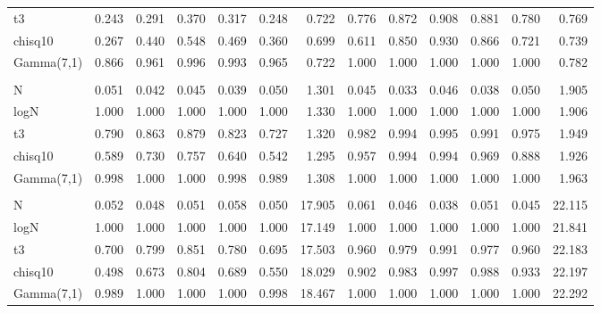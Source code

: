 \begin{table}[!h]
{\begin{tabular}[t]{lrrrrrrrrrrrr}
\hspace{1em}t3 & 0.243 & 0.291 & 0.370 & 0.317 & 0.248 & 0.722 & 0.776 & 0.872 & 0.908 & 0.881 & 0.780 & 0.769\\
\hspace{1em}chisq10 & 0.267 & 0.440 & 0.548 & 0.469 & 0.360 & 0.699 & 0.611 & 0.850 & 0.930 & 0.866 & 0.721 & 0.739\\
\hspace{1em}Gamma(7,1) & 0.866 & 0.961 & 0.996 & 0.993 & 0.965 & 0.722 & 1.000 & 1.000 & 1.000 & 1.000 & 1.000 & 0.782\\
\addlinespace[0.3em]
\multicolumn{13}{l}{\textbf{Random Projections}}\\
\hspace{1em}N & 0.051 & 0.042 & 0.045 & 0.039 & 0.050 & 1.301 & 0.045 & 0.033 & 0.046 & 0.038 & 0.050 & 1.905\\
\hspace{1em}logN & 1.000 & 1.000 & 1.000 & 1.000 & 1.000 & 1.330 & 1.000 & 1.000 & 1.000 & 1.000 & 1.000 & 1.906\\
\hspace{1em}t3 & 0.790 & 0.863 & 0.879 & 0.823 & 0.727 & 1.320 & 0.982 & 0.994 & 0.995 & 0.991 & 0.975 & 1.949\\
\hspace{1em}chisq10 & 0.589 & 0.730 & 0.757 & 0.640 & 0.542 & 1.295 & 0.957 & 0.994 & 0.994 & 0.969 & 0.888 & 1.926\\
\hspace{1em}Gamma(7,1) & 0.998 & 1.000 & 1.000 & 0.998 & 0.989 & 1.308 & 1.000 & 1.000 & 1.000 & 1.000 & 1.000 & 1.963\\
\addlinespace[0.3em]
\multicolumn{13}{l}{\textbf{Psaradakis and Vavra}}\\
\hspace{1em}N & 0.052 & 0.048 & 0.051 & 0.058 & 0.050 & 17.905 & 0.061 & 0.046 & 0.038 & 0.051 & 0.045 & 22.115\\
\hspace{1em}logN & 1.000 & 1.000 & 1.000 & 1.000 & 1.000 & 17.149 & 1.000 & 1.000 & 1.000 & 1.000 & 1.000 & 21.841\\
\hspace{1em}t3 & 0.700 & 0.799 & 0.851 & 0.780 & 0.695 & 17.503 & 0.960 & 0.979 & 0.991 & 0.977 & 0.960 & 22.183\\
\hspace{1em}chisq10 & 0.498 & 0.673 & 0.804 & 0.689 & 0.550 & 18.029 & 0.902 & 0.983 & 0.997 & 0.988 & 0.933 & 22.197\\
\hspace{1em}Gamma(7,1) & 0.989 & 1.000 & 1.000 & 1.000 & 0.998 & 18.467 & 1.000 & 1.000 & 1.000 & 1.000 & 1.000 & 22.292\\

\end{tabular}}
\end{table}
